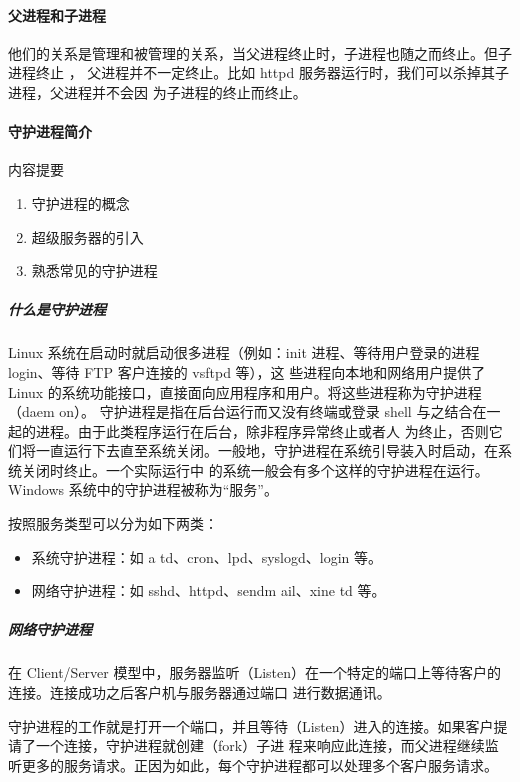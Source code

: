 \documentclass[letterpaper,10pt]{sphinxmanual}
\begin{document}
\paragraph{父进程和子进程}
\label{Linux_pro_mana/process:id8}
他们的关系是管理和被管理的关系，当父进程终止时，子进程也随之而终止。但子进程终止 ，
父进程并不一定终止。比如 httpd 服务器运行时，我们可以杀掉其子进程，父进程并不会因
为子进程的终止而终止。


\paragraph{守护进程简介}
\label{Linux_pro_mana/process:id9}
内容提要
\begin{enumerate}
\item {} 
守护进程的概念

\item {} 
超级服务器的引入

\item {} 
熟悉常见的守护进程

\end{enumerate}


\subparagraph{什么是守护进程}
\label{Linux_pro_mana/process:id10}
Linux 系统在启动时就启动很多进程（例如：init 进程、等待用户登录的进程 login、等待 FTP 客户连接的 vsftpd 等），这
些进程向本地和网络用户提供了 Linux 的系统功能接口，直接面向应用程序和用户。将这些进程称为守护进程（daem on）。
守护进程是指在后台运行而又没有终端或登录 shell 与之结合在一起的进程。由于此类程序运行在后台，除非程序异常终止或者人
为终止，否则它们将一直运行下去直至系统关闭。一般地，守护进程在系统引导装入时启动，在系统关闭时终止。一个实际运行中
的系统一般会有多个这样的守护进程在运行。Windows 系统中的守护进程被称为“服务”。

按照服务类型可以分为如下两类：
\begin{itemize}
\item {} 
系统守护进程：如 a td、cron、lpd、syslogd、login 等。

\item {} 
网络守护进程：如 sshd、httpd、sendm ail、xine td 等。

\end{itemize}


\subparagraph{网络守护进程}
\label{Linux_pro_mana/process:id11}
在 Client/Server 模型中，服务器监听（Listen）在一个特定的端口上等待客户的连接。连接成功之后客户机与服务器通过端口
进行数据通讯。

守护进程的工作就是打开一个端口，并且等待（Listen）进入的连接。如果客户提请了一个连接，守护进程就创建（fork）子进
程来响应此连接，而父进程继续监听更多的服务请求。正因为如此，每个守护进程都可以处理多个客户服务请求。
\end{document}
